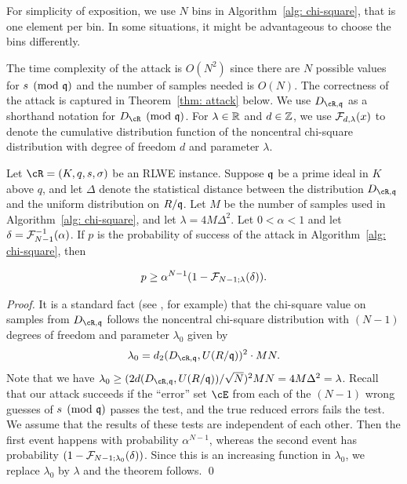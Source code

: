 \documentclass[envcountsame]{llncs}
\begin{document}
\begin{remark}
For simplicity of exposition, we use $N$ bins in Algorithm~\ref{alg: chi-square}, that is one element per bin. In some situations,
it might be advantageous to choose the bins differently.
\end{remark}



The time complexity of the attack is $O(N^2)$ since there are $N$ possible values for $s \pmod {\mathfrak{q}}$ and the number of samples needed is $O(N)$. The correctness of the attack is captured in Theorem~\ref{thm: attack} below. We use $D_{\cR,\fq}$ as a shorthand notation for $D_{\cR} \pmod{\fq}$. For $\lambda \in \mathbb{R}$ and $d \in \mathbb{Z}$, we use $\mathcal{F}_{d,\lambda}(x)$ to denote the cumulative distribution function of the noncentral chi-square distribution with degree of freedom $d$ and parameter $\lambda$.

\begin{theorem} \label{thm: attack}
Let $\cR  = (K,q,s, \sigma)$ be an RLWE instance. Suppose $\mathfrak{q}$ be a prime ideal in $K$ above $q$, and let $\Delta$ denote the statistical distance between the distribution $D_{\cR, \fq}$ and the uniform distribution on $R/\mathfrak{q}$.  Let $M$ be the number of samples used in Algorithm~\ref{alg: chi-square}, and let $\lambda = 4 M \Delta^2$. Let $0 < \alpha < 1$ and let $\delta = \mathcal{F}_{N-1}^{-1}(\alpha)$. If $p$ is the probability of success of the attack in Algorithm~\ref{alg: chi-square}, then

$$p  \geq \alpha^{N-1} (1-  \mathcal{F}_{N-1; \lambda}(\delta) ).$$
\end{theorem}

\begin{proof}
It is a standard fact (see \cite{ryabko2004new}, for example) that the chi-square value on samples from $D_{\cR, \fq}$  follows the noncentral chi-square distribution with $(N-1)$ degrees of freedom and parameter $\lambda_0$ given by
\[
    \lambda_0 =  d_2(D_{\cR, \fq}, U(R/\fq))^2 \cdot MN.
\]
Note that we have $\lambda_0 \geq (2d(D_{\cR, \fq}, U(R/\fq))/\sqrt{N})^2 MN = 4M\Delta^2 = \lambda$. Recall that our attack succeeds if the ``error'' set $\cE$ from each of the $(N-1)$ wrong guesses of $s \pmod{\mathfrak{q}}$ passes the test, and the true reduced errors fails the test. We assume that the results of these tests are independent of each other. Then the first event happens with probability $\alpha^{N-1}$, whereas the second event has probability  $(1-  \mathcal{F}_{N-1; \lambda_0}(\delta))$. Since this is an increasing function in $\lambda_0$, we replace $\lambda_0$ by $\lambda$ and the theorem follows.
\qed \end{proof}
\end{document}
